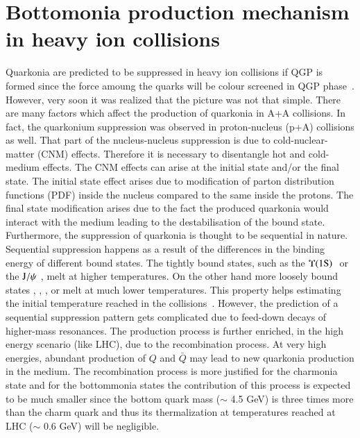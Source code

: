 \section{Bottomonia production mechanism in heavy ion collisions}
\label{sec:Bottomonia_hi}

Quarkonia are predicted to be suppressed in heavy ion collisions
if QGP is formed since the force amoung the quarks will be colour screened
in QGP phase~\cite{Matsui:1986dk}.
 However, very soon it was realized that the picture was not that simple.
There are many factors which affect the production of quarkonia in A+A collisions. 
In fact, the quarkonium suppression was observed in proton-nucleus (p+A)
collisions as well.
That part of the nucleus-nucleus suppression is due to 
cold-nuclear-matter (CNM) effects. Therefore it is necessary to disentangle hot 
and cold-medium effects. The CNM effects can arise at the initial
state and/or the final state. The initial state effect
arises due to modification of parton distribution functions (PDF) inside the nucleus
compared to the same inside the protons. The final state modification 
arises due to the  fact the produced quarkonia would interact with the medium
leading to the destabilisation of the bound state. Furthermore, the suppression of
quarkonia is thought to be sequential in nature. Sequential suppression
happens as a result of the differences in the  binding energy of different bound states. 
The tightly bound states, such as the $\Upsilon\mathrm{(1S)}\hspace {0.05in}$ or the $\mathrm{J}/\psi\hspace {0.05in}$,  melt at higher 
temperatures. On the other hand  more loosely bound states \psiP, \chic, \chib, 
\upsb or \upsc  melt at much lower temperatures. This property helps  
estimating the initial temperature reached in 
the collisions~\cite{Digal:2001ue}. However, the prediction of a sequential 
suppression pattern gets complicated due to feed-down 
decays of higher-mass resonances. The production process is further 
enriched, in the high energy scenario (like LHC), due to the recombination process. At very 
high energies, abundant production of $Q$ and $\bar Q$ may lead to new quarkonia production 
in the medium. The recombination process is more justified for the charmonia state and 
for the bottommonia states the contribution of this process is expected to be much
smaller since the bottom quark mass ($\sim$ 4.5 GeV) is three times more than the
charm quark and thus its thermalization at temperatures reached at LHC
($\sim$ 0.6 GeV) will be negligible. 





